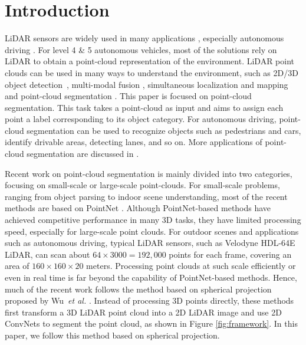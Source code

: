 \documentclass[runningheads]{llncs}
\begin{document}
\section{Introduction}
\label{intro}
LiDAR sensors are widely used in many applications  \cite{xie2019review}, especially autonomous driving \cite{geiger2013vision,wu2017squeezeseg,behley2019iccv}. For level 4 \& 5 autonomous vehicles, most of the solutions rely on LiDAR to obtain a point-cloud representation of the environment. LiDAR point clouds can be used in many ways to understand the environment, such as 2D/3D object detection~\cite{zhou2018voxelnet,chen2017multi,song2016deep,qi2018frustum}, multi-modal fusion \cite{zhou2019end,jaritz2019xmuda}, simultaneous localization and mapping \cite{chen2019suma++,behley2018efficient} and point-cloud segmentation \cite{wu2017squeezeseg,wu2018squeezesegv2,qi2017pointnet}. This paper is focused on point-cloud segmentation. This task takes a point-cloud as input and aims to assign each point a label corresponding to its object category. For autonomous driving, point-cloud segmentation can be used to recognize objects such as pedestrians and cars, identify drivable areas, detecting lanes, and so on. More applications of point-cloud segmentation are discussed in \cite{xie2019review}. 

Recent work on point-cloud segmentation is mainly divided into two categories, focusing on small-scale or large-scale point-clouds. For small-scale problems, ranging from object parsing to indoor scene understanding, most of the recent methods are based on PointNet \cite{qi2017pointnet,qi2017pointnet++}. Although PointNet-based methods have achieved competitive performance in many 3D tasks, they have limited processing speed, especially for large-scale point clouds. For outdoor scenes and applications such as autonomous driving, typical LiDAR sensors, such as Velodyne HDL-64E LiDAR, can scan about $64 \times 3000 =192,000$ points for each frame, covering an area of $160 \times 160 \times 20$ meters. Processing point clouds at such scale efficiently or even in real time is far beyond the capability of PointNet-based methods. Hence, much of the recent work follows the method based on spherical projection proposed by Wu~\textit{et al.} \cite{wu2017squeezeseg,wu2018squeezesegv2}. Instead of processing 3D points directly, these methods first transform a 3D LiDAR point cloud into a 2D LiDAR image and use 2D ConvNets to segment the point cloud, as shown in Figure \ref{fig:framework}. In this paper, we follow this method based on spherical projection.  
\end{document}
